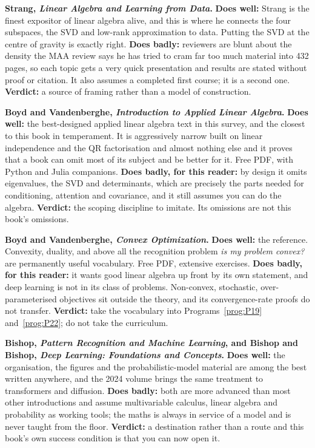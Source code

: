 \medskip
\textbf{Strang, \emph{Linear Algebra and Learning from Data}.}
\textbf{Does well:} Strang is the finest expositor of linear algebra alive, and
this is where he connects the four subspaces, the SVD and low-rank
approximation to data. Putting the SVD at the centre of gravity is exactly
right. \textbf{Does badly:}
reviewers are blunt about the density \dash{} the MAA review says he has tried
to cram far too much material into 432 pages, so each topic gets a very quick
presentation and results are stated without proof or citation. It also assumes
a completed first course; it is a second one.
\textbf{Verdict:} a source of framing rather than a model of construction.

\medskip
\textbf{Boyd and Vandenberghe, \emph{Introduction to Applied Linear Algebra}.}
\textbf{Does well:} the best-designed applied linear algebra text in this
survey, and the closest to this book in temperament. It is aggressively narrow
\dash{}
built on linear independence and the QR factorisation and almost nothing else
\dash{} and it proves that a book can omit most of its subject and be better
for it. Free PDF, with Python and Julia companions.
\textbf{Does badly, for this reader:} by design it omits eigenvalues, the SVD
and determinants, which are precisely the parts needed for conditioning,
attention and covariance, and it still assumes you can do the algebra.
\textbf{Verdict:} the scoping discipline to imitate. Its omissions are not this
book's omissions.

\medskip
\textbf{Boyd and Vandenberghe, \emph{Convex Optimization}.}
\textbf{Does well:} the reference. Convexity, duality, and above all the
recognition problem \dash{} \emph{is my problem convex?} \dash{} are
permanently useful vocabulary. Free PDF, extensive exercises.
\textbf{Does badly, for this reader:} it wants good linear algebra up front by
its own statement, and deep learning is not in its class of problems.
Non-convex, stochastic, over-parameterised objectives sit outside the theory,
and its convergence-rate proofs do not transfer.
\textbf{Verdict:} take the vocabulary into Programs~\ref{prog:P19}
and~\ref{prog:P22}; do not take the curriculum.

\medskip
\textbf{Bishop, \emph{Pattern Recognition and Machine Learning}, and Bishop and
Bishop, \emph{Deep Learning: Foundations and Concepts}.}
\textbf{Does well:} the organisation, the figures and the probabilistic-model
material are among the best written anywhere, and the 2024 volume brings the
same treatment to transformers and diffusion. \textbf{Does badly:} both are
more advanced than most other introductions and assume multivariable calculus,
linear algebra and probability as working tools; the maths is always in service
of a model and is never taught from the floor.
\textbf{Verdict:} a destination rather than a route \dash{} and this book's own
success condition is that you can now open it.


